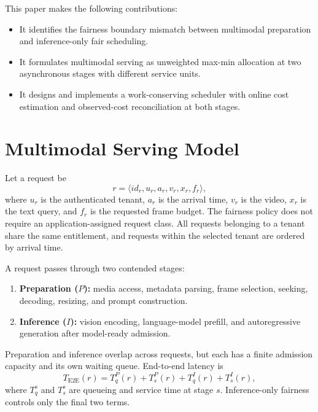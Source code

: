 \documentclass[sigplan,anonymous,review,nonacm]{acmart}
\begin{document}
This paper makes the following contributions:

\begin{itemize}
    \item It identifies the fairness boundary mismatch between multimodal
    preparation and inference-only fair scheduling.
    \item It formulates multimodal serving as unweighted max-min allocation at
    two asynchronous stages with different service units.
    \item It designs and implements a work-conserving scheduler with online
    cost estimation and observed-cost reconciliation at both stages.
\end{itemize}

\section{Multimodal Serving Model}

Let a request be
\begin{equation}
r = \langle id_r, u_r, a_r, v_r, x_r, f_r \rangle,
\end{equation}
where $u_r$ is the authenticated tenant, $a_r$ is the arrival time, $v_r$ is
the video, $x_r$ is the text query, and $f_r$ is the requested frame budget.
The fairness policy does not require an application-assigned request class.
All requests belonging to a tenant share the same entitlement, and requests
within the selected tenant are ordered by arrival time.

A request passes through two contended stages:

\begin{enumerate}
    \item \textbf{Preparation ($P$):} media access, metadata parsing, frame
    selection, seeking, decoding, resizing, and prompt construction.
    \item \textbf{Inference ($I$):} vision encoding, language-model prefill,
    and autoregressive generation after model-ready admission.
\end{enumerate}

Preparation and inference overlap across requests, but each has a finite
admission capacity and its own waiting queue. End-to-end latency is
\begin{equation}
T_{\mathrm{E2E}}(r) =
T^P_q(r) + T^P_s(r) + T^I_q(r) + T^I_s(r),
\end{equation}
where $T^s_q$ and $T^s_s$ are queueing and service time at stage $s$.
Inference-only fairness controls only the final two terms.
\end{document}
